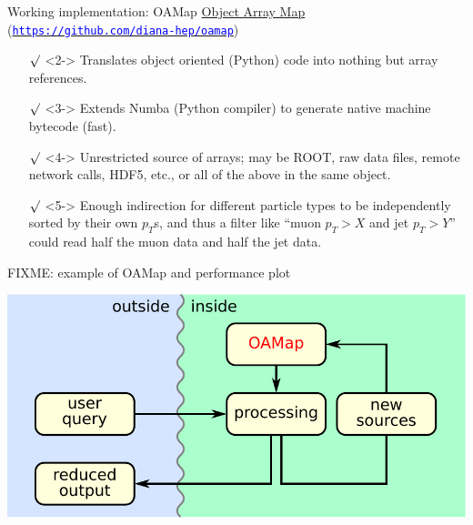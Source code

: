 \documentclass[aspectratio=169]{beamer}
\begin{document}
\begin{frame}{Working implementation: OAMap}
\vspace{0.5 cm}
\underline{Object Array Map} (\href{https://github.com/diana-hep/oamap}{\textcolor{blue}{\tt https://github.com/diana-hep/oamap}})

\vspace{0.25 cm}
\begin{itemize}\setlength{\itemsep}{0.25 cm}
\item[$\surd$]<2-> Translates object oriented (Python) code into nothing but array references.
\item[$\surd$]<3-> Extends Numba (Python compiler) to generate native machine bytecode (fast).
\item[$\surd$]<4-> Unrestricted source of arrays; may be ROOT, raw data files, remote network calls, HDF5, etc., or all of the above in the same object.
\item[$\surd$]<5-> Enough indirection for different particle types to be independently sorted by their own $p_T$s, and thus a filter like ``muon $p_T > X$ and jet $p_T > Y$'' could read half the muon data and half the jet data.
\end{itemize}
\end{frame}

\begin{frame}{}
FIXME: example of OAMap and performance plot
\end{frame}

\begin{frame}{}
\vspace{1 cm}
\begin{center}
\includegraphics[width=0.7\linewidth]{block-diagram-source.pdf}
\end{center}
\end{frame}
\end{document}
